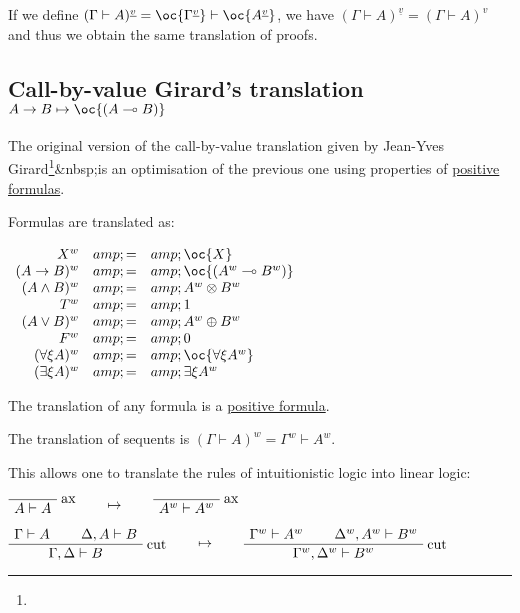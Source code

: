 If we define
\((\Gamma\vdash A)^{\underline{v}} = \oc{\Gamma^{\underline{v}}}\vdash\oc{A^{\underline{v}}}\),
we have \((\Gamma\vdash A)^{\underline{v}} = (\Gamma\vdash A)^v\) and
thus we obtain the same translation of proofs.

\subsection{\texorpdfstring{Call-by-value Girard's translation
\(A\imp B \mapsto \oc{(A\limp B)}\)}{Call-by-value Girard's translation A\textbackslash{}imp B \textbackslash{}mapsto \textbackslash{}oc\{(A\textbackslash{}limp B)\}}}\label{call-by-value-girards-translation-aimp-b-mapsto-ocalimp-b}

The original version of the call-by-value translation given by Jean-Yves
Girard\footnote{}\&nbsp;is an optimisation of the previous one using
properties of \href{positive_formula}{positive formulas}.

Formulas are translated as:

\(\begin{array}{rcl}
X^w &amp; = &amp; \oc{X} \\
(A\imp B)^w &amp; = &amp; \oc{(A^w\limp B^w)} \\
(A\wedge B)^w &amp; = &amp; A^w \tens B^w \\
T^w &amp; = &amp; \one \\
(A\vee B)^w &amp; = &amp; A^w\plus B^w \\
F^w &amp; = &amp; \zero \\
(\forall\xi A)^w &amp; = &amp; \oc{\forall\xi A^w} \\
(\exists\xi A)^w &amp; = &amp; \exists\xi A^w
\end{array}\)

The translation of any formula is a \href{positive_formula}{positive
formula}.

The translation of sequents is
\((\Gamma\vdash A)^w = \Gamma^w\vdash A^w\).

This allows one to translate the rules of intuitionistic logic into
linear logic:

\(\LabelRule{\rulename{ax}}
\NulRule{A\vdash A}
\DisplayProof
\qquad\mapsto\qquad
\LabelRule{\rulename{ax}}
\NulRule{A^w\vdash A^w}
\DisplayProof\)

\(\AxRule{\Gamma\vdash A}
\AxRule{\Delta,A\vdash B}
\LabelRule{\rulename{cut}}
\BinRule{\Gamma,\Delta\vdash B}
\DisplayProof
\qquad\mapsto\qquad
\AxRule{\Gamma^w\vdash A^w}
\AxRule{\Delta^w,A^w\vdash B^w}
\LabelRule{\rulename{cut}}
\BinRule{\Gamma^w,\Delta^w\vdash B^w}
\DisplayProof\)

